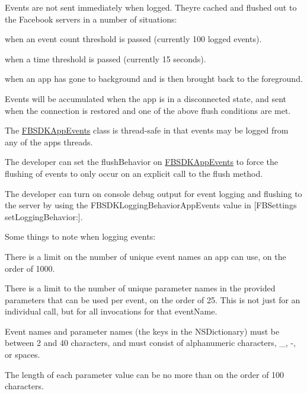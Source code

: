 \begin{DoxyItemize}
\item Events are not sent immediately when logged. They\textquotesingle{}re cached and flushed out to the Facebook servers in a number of situations\+:
\item when an event count threshold is passed (currently 100 logged events).
\item when a time threshold is passed (currently 15 seconds).
\item when an app has gone to background and is then brought back to the foreground.
\item Events will be accumulated when the app is in a disconnected state, and sent when the connection is restored and one of the above \textquotesingle{}flush\textquotesingle{} conditions are met.
\item The {\ttfamily \hyperlink{interface_f_b_s_d_k_app_events}{F\+B\+S\+D\+K\+App\+Events}} class is thread-\/safe in that events may be logged from any of the app\textquotesingle{}s threads.
\item The developer can set the {\ttfamily flush\+Behavior} on {\ttfamily \hyperlink{interface_f_b_s_d_k_app_events}{F\+B\+S\+D\+K\+App\+Events}} to force the flushing of events to only occur on an explicit call to the {\ttfamily flush} method.
\item The developer can turn on console debug output for event logging and flushing to the server by using the {\ttfamily F\+B\+S\+D\+K\+Logging\+Behavior\+App\+Events} value in {\ttfamily \mbox{[}F\+B\+Settings set\+Logging\+Behavior\+:\mbox{]}}.
\end{DoxyItemize}

Some things to note when logging events\+:


\begin{DoxyItemize}
\item There is a limit on the number of unique event names an app can use, on the order of 1000.
\item There is a limit to the number of unique parameter names in the provided parameters that can be used per event, on the order of 25. This is not just for an individual call, but for all invocations for that event\+Name.
\item Event names and parameter names (the keys in the N\+S\+Dictionary) must be between 2 and 40 characters, and must consist of alphanumeric characters, \+\_\+, -\/, or spaces.
\item The length of each parameter value can be no more than on the order of 100 characters. 
\end{DoxyItemize}

